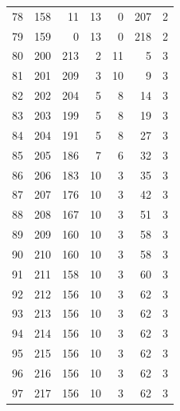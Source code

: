 \documentclass[a4paper,twoside,12pt]{book}
\begin{document}
\begin{appendices}
\begin{table}
\begin{tabular}{lrrrrrr}
		78  &    158 &        11 &        13 &               0 &             207 &         2 \\
		79  &    159 &         0 &        13 &               0 &             218 &         2 \\
		80  &    200 &       213 &         2 &              11 &               5 &         3 \\
		81  &    201 &       209 &         3 &              10 &               9 &         3 \\
		82  &    202 &       204 &         5 &               8 &              14 &         3 \\
		83  &    203 &       199 &         5 &               8 &              19 &         3 \\
		84  &    204 &       191 &         5 &               8 &              27 &         3 \\
		85  &    205 &       186 &         7 &               6 &              32 &         3 \\
		86  &    206 &       183 &        10 &               3 &              35 &         3 \\
		87  &    207 &       176 &        10 &               3 &              42 &         3 \\
		88  &    208 &       167 &        10 &               3 &              51 &         3 \\
		89  &    209 &       160 &        10 &               3 &              58 &         3 \\
		90  &    210 &       160 &        10 &               3 &              58 &         3 \\
		91  &    211 &       158 &        10 &               3 &              60 &         3 \\
		92  &    212 &       156 &        10 &               3 &              62 &         3 \\
		93  &    213 &       156 &        10 &               3 &              62 &         3 \\
		94  &    214 &       156 &        10 &               3 &              62 &         3 \\
		95  &    215 &       156 &        10 &               3 &              62 &         3 \\
		96  &    216 &       156 &        10 &               3 &              62 &         3 \\
		97  &    217 &       156 &        10 &               3 &              62 &         3 \\

\end{tabular}
\end{table}
\end{appendices}
\end{document}
